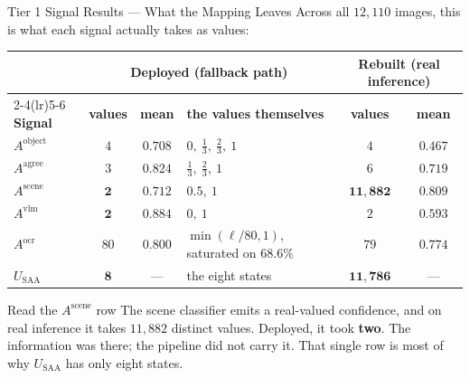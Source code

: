 \documentclass[aspectratio=169,11pt]{beamer}
\begin{document}
\begin{frame}{Tier 1 Signal Results --- What the Mapping Leaves}
\scriptsize
Across all $12{,}110$ images, this is what each signal actually takes as values:
\vspace{1mm}
\begin{center}
\begin{tabular}{@{}l c c l c c@{}}
\toprule
& \multicolumn{3}{c}{\textbf{Deployed (fallback path)}} & \multicolumn{2}{c}{\textbf{Rebuilt (real inference)}} \\
\cmidrule(lr){2-4}\cmidrule(lr){5-6}
\textbf{Signal} & \textbf{values} & \textbf{mean} & \textbf{the values themselves} & \textbf{values} & \textbf{mean} \\
\midrule
$A^{\text{object}}$ & $4$ & $0.708$ & $0,\ \tfrac13,\ \tfrac23,\ 1$ & $4$ & $0.467$ \\
$A^{\text{agree}}$ & $3$ & $0.824$ & $\tfrac13,\ \tfrac23,\ 1$ & $6$ & $0.719$ \\
$A^{\text{scene}}$ & $\mathbf{2}$ & $0.712$ & $0.5,\ 1$ & $\mathbf{11{,}882}$ & $0.809$ \\
$A^{\text{vlm}}$ & $\mathbf{2}$ & $0.884$ & $0,\ 1$ & $2$ & $0.593$ \\
$A^{\text{ocr}}$ & $80$ & $0.800$ & $\min(\ell/80,1)$, saturated on $68.6\%$ & $79$ & $0.774$ \\
\midrule
$U_{\text{SAA}}$ & $\mathbf{8}$ & --- & the eight states & $\mathbf{11{,}786}$ & --- \\
\bottomrule
\end{tabular}
\end{center}
\vspace{1mm}
\begin{alertblock}{\small Read the $A^{\text{scene}}$ row}
\footnotesize The scene classifier emits a real-valued confidence, and on real inference it takes $11{,}882$ distinct values. Deployed, it took \textbf{two}. The information was there; the pipeline did not carry it. That single row is most of why $U_{\text{SAA}}$ has only eight states.
\end{alertblock}
\end{frame}
\end{document}
